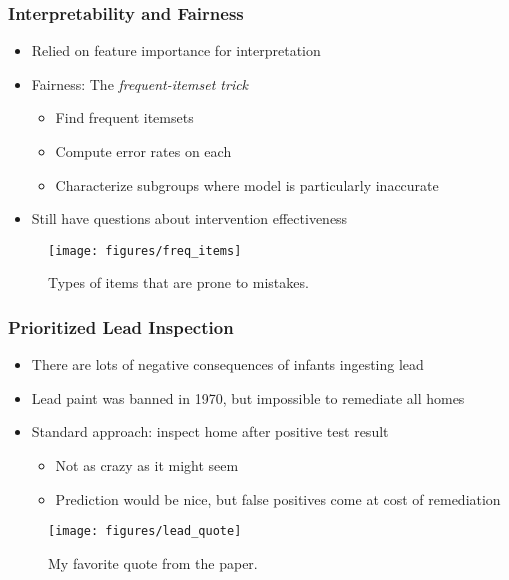 \documentclass[10pt,mathserif]{beamer}
\begin{document}
\begin{frame}
  \frametitle{Interpretability and Fairness}
  \begin{itemize}
  \item Relied on feature importance for interpretation
  \item Fairness: The \textit{frequent-itemset trick}
    \begin{itemize}
    \item Find frequent itemsets
    \item Compute error rates on each
    \item Characterize subgroups where model is particularly inaccurate
    \end{itemize}
  \item Still have questions about intervention effectiveness
  \end{itemize}
\begin{figure}[ht]
  \centering
  \texttt{[image: figures/freq\_items]}
  \caption{Types of items that are prone to mistakes. \label{fig:label} }
\end{figure}

\end{frame}

\begin{frame}
  \frametitle{Prioritized Lead Inspection}
  \begin{itemize}
  \item There are lots of negative consequences of infants ingesting lead
  \item Lead paint was banned in 1970, but impossible to remediate all homes
  \item Standard approach: inspect home after positive test result
    \begin{itemize}
    \item Not as crazy as it might seem
    \item Prediction would be nice, but false positives come at cost of
      remediation
    \end{itemize}
  \end{itemize}
\begin{figure}
  \centering
  \texttt{[image: figures/lead\_quote]}
  \caption{My favorite quote from the paper.}
\end{figure}

\end{frame}
\end{document}
